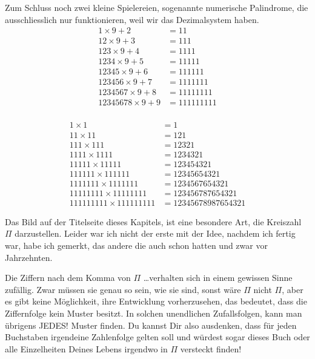 Zum Schluss noch zwei kleine Spielereien, sogenannte numerische Palindrome, die ausschliesslich nur funktionieren, weil wir das Dezimalsystem haben. 
\begin{equation*}
\begin{aligned}
1\times9 + 2 &= 11\\
12\times9 + 3 &= 111\\
123\times9 + 4 &= 1111\\
1234\times9 + 5&= 11111\\
12345\times9 + 6 &= 111111\\
123456\times9 + 7 &= 1111111\\
1234567\times9 + 8 &= 11111111\\
12345678\times9 + 9 &= 111111111\\
\end{aligned}
\end{equation*}

\begin{equation*}
\begin{aligned}
1\times1 &= 1\\
11\times11 &= 121\\
111\times111 &= 12321\\
1111\times1111 &= 1234321\\
11111\times11111 &= 123454321\\
111111\times111111 &= 12345654321\\
1111111\times1111111 &= 1234567654321\\
11111111\times11111111 &= 123456787654321\\
111111111\times111111111 &= 12345678987654321
\end{aligned}
\end{equation*}
\hfill {}

\newpage

{\centering\fontsize{20}{28} \color{farbe}\par}

Das Bild auf der Titelseite dieses Kapitels, ist eine besondere Art, die Kreiszahl $\Pi$ darzustellen. Leider war ich nicht der erste mit der Idee, nachdem ich fertig war, habe ich gemerkt, das andere die auch schon hatten und zwar vor Jahrzehnten.

Die Ziffern nach dem Komma von $\Pi$ \hfill{}\dots verhalten sich in einem gewissen Sinne zufällig. Zwar müssen sie genau so sein, wie sie sind, sonst wäre $\Pi$ nicht $\Pi$, aber es gibt keine Möglichkeit, ihre Entwicklung vorherzusehen, das bedeutet, dass die Ziffernfolge kein Muster besitzt. In solchen unendlichen Zufallsfolgen, kann man übrigens JEDES! Muster finden. Du kannst Dir also ausdenken, dass für jeden Buchstaben irgendeine Zahlenfolge gelten soll und würdest sogar dieses Buch oder alle Einzelheiten Deines Lebens irgendwo in $\Pi$ versteckt finden!

